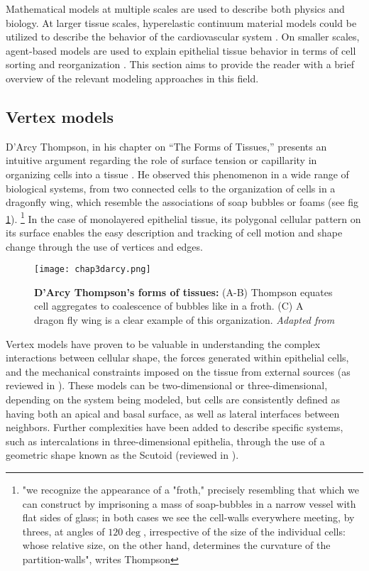 Mathematical models at multiple scales are used to describe both physics and biology. At larger tissue scales, hyperelastic continuum material models could be utilized to describe the behavior of the cardiovascular system \cite{holzapfel2019}. On smaller scales, agent-based models are used to explain epithelial tissue behavior in terms of cell sorting and reorganization \cite{voss-bohme2012}. This section aims to provide the reader with a brief overview of the relevant modeling approaches in this field.

\hypertarget{vertex-models}{%
	\subsection{Vertex models}\label{vertex-models}}

D'Arcy Thompson, in his chapter on ``The Forms of Tissues,'' presents an intuitive argument regarding the role of surface tension or capillarity in organizing cells into a tissue \cite{thompson1979, graner2017}. He observed this phenomenon in a wide range of biological systems, from two connected cells to the organization of cells in a dragonfly wing, which resemble the
associations of soap bubbles or foams (see fig \ref{fig_3_6}).
\footnote{"we recognize the appearance of a "froth," precisely resembling that which we can construct by imprisoning a mass of soap-bubbles in a narrow vessel with flat sides of glass; in both cases we see the cell-walls everywhere meeting, by threes, at angles of $120 \deg$, irrespective of the size of the individual cells: whose relative size, on the other hand, determines the curvature of the partition-walls", writes Thompson}
In the case of monolayered epithelial tissue, its polygonal cellular pattern on its surface enables the easy description and tracking of cell motion and shape change through the use of vertices and edges.

\begin{figure}
	\centering
	\texttt{[image: chap3darcy.png]}
	\caption{\label{fig_3_6} \textbf{D'Arcy Thompson's forms of tissues:} (A-B) Thompson equates cell aggregates to coalescence of bubbles like in a froth. (C) A dragon fly wing is a clear example of this organization. \textit{Adapted from \cite{thompson1979}}
	}
\end{figure}

Vertex models have proven to be valuable in understanding the complex interactions between cellular shape, the forces generated within epithelial cells, and the mechanical constraints imposed on the tissue from external sources (as reviewed in \cite{alt2017}). These models can be two-dimensional or three-dimensional, depending on the system being modeled, but cells are consistently defined as having both an apical and basal surface, as well as lateral interfaces between neighbors. Further complexities have been added to describe specific systems, such as intercalations in three-dimensional epithelia, through the use of a geometric shape known as the Scutoid (reviewed in \cite{gomez-galvez2021}).

